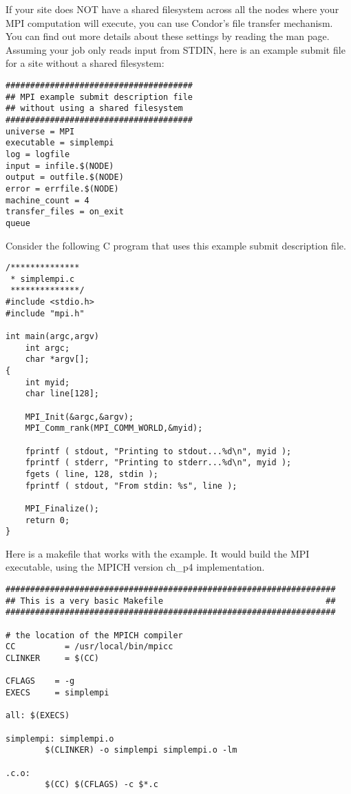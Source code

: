 If your site does NOT have a shared filesystem across all the nodes
where your MPI computation will execute, you can use Condor's file
transfer mechanism.
You can find out more details about these settings by reading the
 man page.
Assuming your job only reads input from STDIN, here is an example
submit file for a site without a shared filesystem:

\begin{verbatim}
######################################
## MPI example submit description file
## without using a shared filesystem
######################################
universe = MPI
executable = simplempi
log = logfile
input = infile.$(NODE)
output = outfile.$(NODE)
error = errfile.$(NODE)
machine_count = 4
transfer_files = on_exit
queue
\end{verbatim}

Consider the following C program that uses this example submit
description file.

\begin{verbatim}
/**************
 * simplempi.c
 **************/
#include <stdio.h>
#include "mpi.h"

int main(argc,argv)
    int argc;
    char *argv[];
{
    int myid;
    char line[128];

    MPI_Init(&argc,&argv);
    MPI_Comm_rank(MPI_COMM_WORLD,&myid);

    fprintf ( stdout, "Printing to stdout...%d\n", myid );
    fprintf ( stderr, "Printing to stderr...%d\n", myid );
    fgets ( line, 128, stdin );
    fprintf ( stdout, "From stdin: %s", line );

    MPI_Finalize();
    return 0;
}
\end{verbatim}

Here is a makefile that works with the example.
It would build the MPI executable, using the MPICH
version ch\_p4 implementation.
\begin{verbatim}
###################################################################
## This is a very basic Makefile                                 ##
###################################################################

# the location of the MPICH compiler
CC          = /usr/local/bin/mpicc
CLINKER     = $(CC)

CFLAGS    = -g
EXECS     = simplempi

all: $(EXECS)

simplempi: simplempi.o
        $(CLINKER) -o simplempi simplempi.o -lm

.c.o:
        $(CC) $(CFLAGS) -c $*.c
\end{verbatim}

